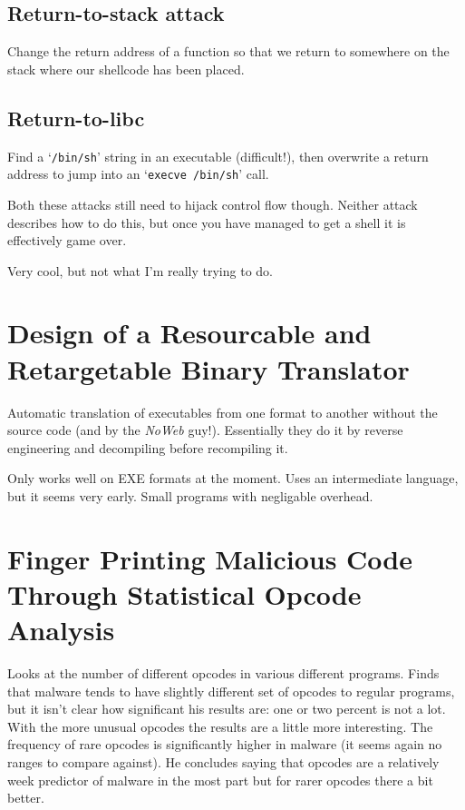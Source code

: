 \subsection{Return-to-stack attack}

Change the return address of a function so that we return to somewhere
on the stack where our shellcode has been placed.

\subsection{Return-to-libc}

Find a `\texttt{/bin/sh}' string in an executable (difficult!), then
overwrite a return address to jump into an `\texttt{execve /bin/sh}'
call.

Both these attacks still need to hijack control flow though. Neither
attack describes how to do this, but once you have managed to get a
shell it is effectively game over.

Very cool, but not what I'm really trying to do.

\section{Design of a Resourcable and Retargetable Binary
Translator\citep{Cifuentes1999}}

Automatic translation of executables from one format to another without
the source code (and by the \emph{NoWeb} guy!). Essentially they do it
by reverse engineering and decompiling before recompiling it.

Only works well on EXE formats at the moment. Uses an intermediate
language, but it seems very early. Small programs with negligable
overhead.

\section{Finger Printing Malicious Code Through Statistical Opcode
Analysis\citep{Bilar2007}}

Looks at the number of different opcodes in various different programs.
Finds that malware tends to have slightly different set of opcodes to
regular programs, but it isn't clear how significant his results are:
one or two percent is not a lot. With the more unusual opcodes the
results are a little more interesting. The frequency of rare opcodes is
significantly higher in malware (it seems again no ranges to compare
against). He concludes saying that opcodes are a relatively week
predictor of malware in the most part but for rarer opcodes there a bit
better.

